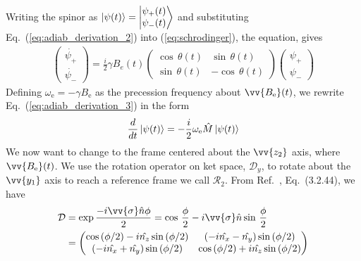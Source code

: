 %
Writing the spinor as
$\Ket{\psi(t)}=\Ket{\begin{matrix}
    \psi_{+}(t)\\
    \psi_{-}(t)
\end{matrix}}$ and substituting Eq.~(\ref{eq:adiab_derivation_2}) into (\ref{eq:schrodinger}), the \schrodinger equation, gives
%
\begin{gather}
    \left(\begin{matrix}
    \dot{\psi_{+}}\\
    \dot{\psi_{-}}
    \end{matrix}\right)=\frac{i}{2}\gamma B_{e}(t)\left(\begin{matrix}
    \cos\, \theta(t) & \sin\, \theta(t)\\
    \sin\, \theta(t) & -\cos\, \theta(t)
    \end{matrix}\right)\left(\begin{matrix}
    \psi_{+}\\
    \psi_{-}
    \end{matrix}\right) \label{eq:adiab_derivation_3}
\end{gather}
%
Defining $\omega_\text{e}=-\gamma B_\text{e}$ as the precession frequency about $\vv{B_\text{e}}(t)$, we rewrite Eq.~(\ref{eq:adiab_derivation_3}) in the form
%
\begin{gather}
    \frac{d}{dt}\Ket{\psi(t)}=-\frac{i}{2}\omega_\text{e}\hat{M}\Ket{\psi(t)}
    \label{eq:adiab_derivation_4}
\end{gather}
%
We now want to change to the frame centered about the $\vv{z_2}$ axis, where $\vv{B_\text{e}}(t)$. We use the rotation operator on ket space, $\mathcal{D}_y$, to rotate about the $\vv{y_1}$ axis to reach a reference frame we call $\mathcal{R}_2$. From Ref.~\cite{sakurai_quantum}, Eq.~(3.2.44), we have
%
\begin{align}
    \mathcal{D} &= \exp{\frac{-i\vv{\sigma}\hat{n}\phi}{2}}=\cos \, \frac{\phi}{2}
                            -i\vv{\sigma}\hat{n} \sin \, \frac{\phi}{2} \nonumber \\
                &= \left(\begin{matrix}\cos\left(\phi / 2\right)-i\hat{n_{z}}\sin\left(\phi / 2\right) & (-i\hat{n_{x}}-\hat{n_{y}})\sin\left(\phi / 2\right) \\
                (-i\hat{n_{x}}+\hat{n_{y}})\sin\left(\phi / 2\right) & \cos\left(\phi / 2\right)+i\hat{n_{z}}\sin\left(\phi / 2\right)
                \end{matrix}\right) \label{eq:rotation_operator}
\end{align}

